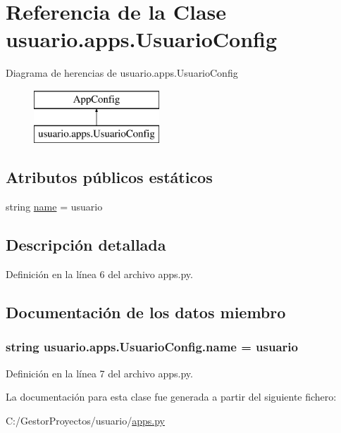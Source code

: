 \hypertarget{classusuario_1_1apps_1_1_usuario_config}{}\section{Referencia de la Clase usuario.\+apps.\+Usuario\+Config}
\label{classusuario_1_1apps_1_1_usuario_config}
Diagrama de herencias de usuario.\+apps.\+Usuario\+Config\begin{figure}[H]
\begin{center}
\leavevmode
\includegraphics[height=2.000000cm]{classusuario_1_1apps_1_1_usuario_config}
\end{center}
\end{figure}
\subsection*{Atributos públicos estáticos}
\begin{DoxyCompactItemize}
\item 
string \hyperlink{classusuario_1_1apps_1_1_usuario_config_af608150fda9192b4cc4d2ca3c63aac35}{name} = \textquotesingle{}usuario\textquotesingle{}
\end{DoxyCompactItemize}


\subsection{Descripción detallada}


Definición en la línea 6 del archivo apps.\+py.



\subsection{Documentación de los datos miembro}
\subsubsection[{\texorpdfstring{name}{name}}]{\setlength{\rightskip}{0pt plus 5cm}string usuario.\+apps.\+Usuario\+Config.\+name = \textquotesingle{}usuario\textquotesingle{}\hspace{0.3cm}{\ttfamily [static]}}\hypertarget{classusuario_1_1apps_1_1_usuario_config_af608150fda9192b4cc4d2ca3c63aac35}{}\label{classusuario_1_1apps_1_1_usuario_config_af608150fda9192b4cc4d2ca3c63aac35}


Definición en la línea 7 del archivo apps.\+py.



La documentación para esta clase fue generada a partir del siguiente fichero\+:\begin{DoxyCompactItemize}
\item 
C\+:/\+Gestor\+Proyectos/usuario/\hyperlink{usuario_2apps_8py}{apps.\+py}\end{DoxyCompactItemize}
